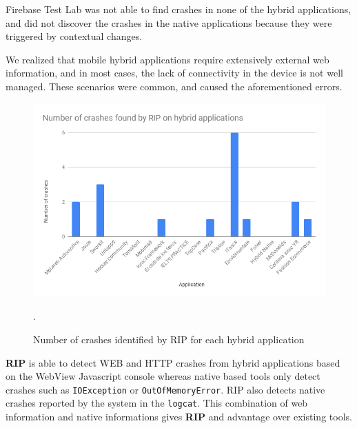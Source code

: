 Firebase Test Lab was not able to find crashes in none of the hybrid applications, and did not discover the crashes in the native applications because they were triggered by contextual changes.

We realized that mobile hybrid applications require extensively external web information, and in most cases, the lack of connectivity in the device is not well managed. These scenarios were common, and caused the aforementioned errors.

\begin{figure}[t]
	\centering
	\includegraphics[width=1\textwidth]{img/crashes.png}
	\vspace{-0.5cm}
	\caption{Number of crashes identified by RIP for each hybrid application}.
	
	\label{crashes}
\end{figure} 

\begin{tcolorbox}[title= \textit{\textbf{RQ$_3$}} Is RIP suitable to detect crashes and bugs in Android apps?]
	\textbf{RIP} is able to detect WEB and HTTP crashes from hybrid applications based on the WebView Javascript console whereas native based tools only detect crashes such as \texttt{IOException} or \texttt{OutOfMemoryError}. RIP also detects native crashes reported by the system in the \texttt{logcat}. This combination of web information and native informations gives \textbf{RIP} and advantage over existing tools.
	
\end{tcolorbox}

